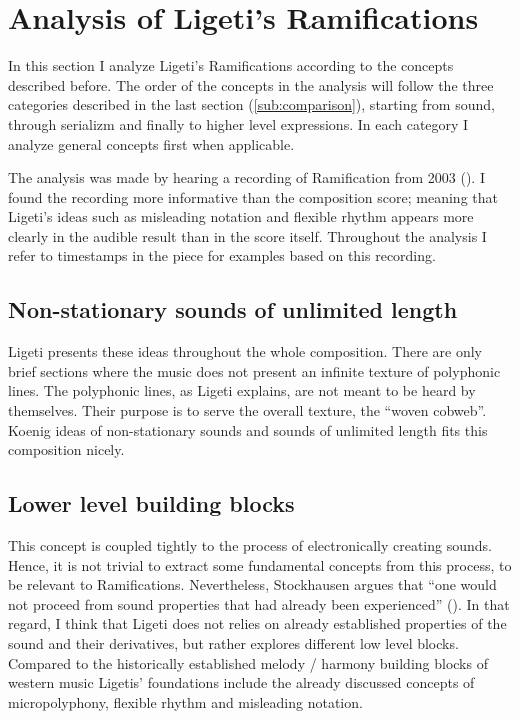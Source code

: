 \documentclass[a4paper,11pt]{article}
\begin{document}
\section{Analysis of Ligeti's Ramifications}
\label{sub:ramifications}

In this section I analyze Ligeti's Ramifications according to the concepts described before.
The order of the concepts in the analysis will follow the three categories described in the last section (\ref{sub:comparison}), starting from sound, through serializm and finally to higher level expressions.
In each category I analyze general concepts first when applicable.

The analysis was made by hearing a recording of Ramification from 2003 (\cite{rami_music}).
I found the recording more informative than the composition score;
meaning that Ligeti's ideas such as misleading notation and flexible rhythm appears more clearly in the audible result than in the score itself.
Throughout the analysis I refer to timestamps in the piece for examples based on this recording.

\subsection*{Non-stationary sounds of unlimited length}

Ligeti presents these ideas throughout the whole composition.
There are only brief sections where the music does not present an infinite texture of polyphonic lines.
The polyphonic lines, as Ligeti explains, are not meant to be heard by themselves.
Their purpose is to serve the overall texture, the ``woven cobweb''.
Koenig ideas of non-stationary sounds and sounds of unlimited length fits this composition nicely.

\subsection*{Lower level building blocks}

This concept is coupled tightly to the process of electronically creating sounds.
Hence, it is not trivial to extract some fundamental concepts from this process, to be relevant to Ramifications.
Nevertheless, Stockhausen argues that ``one would not proceed from sound properties that had already been experienced'' (\cite[p. 42]{stockhausen}).
In that regard, I think that Ligeti does not relies on already established properties of the sound and their derivatives, but rather explores different low level blocks.
Compared to the historically established melody / harmony building blocks of western music Ligetis' foundations include the already discussed concepts of micropolyphony, flexible rhythm and misleading notation.
\end{document}
